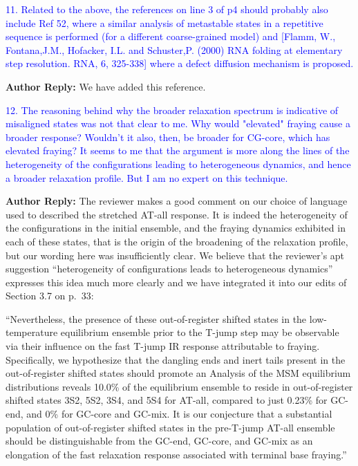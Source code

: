 \documentclass[11pt,a4paper]{letter} %
\newcommand*{\rood}[1]{{\color{red}{#1}}}
\begin{document}
\textcolor{blue}{11. Related to the above, the references on line 3 of p4 should probably also include Ref 52, where a similar analysis of metastable states in a repetitive sequence is performed (for a different coarse-grained model) and [Flamm, W., Fontana,J.M., Hofacker, I.L. and Schuster,P. (2000) RNA folding at elementary step resolution. RNA, 6, 325-338] where a defect diffusion mechanism is proposed.
}

\textbf{Author Reply:}   We have added this reference.


\textcolor{blue}{12. The reasoning behind why the broader relaxation spectrum is indicative of misaligned states was not that clear to me. Why would "elevated" fraying cause a broader response? Wouldn't it also, then, be broader for CG-core, which has elevated fraying? It seems to me that the argument is more along the lines of the heterogeneity of the configurations leading to heterogeneous dynamics, and hence a broader relaxation profile. But I am no expert on this technique.}

\textbf{Author Reply:}   The reviewer makes a good comment on our choice of language used to described the stretched AT-all response. It is indeed the heterogeneity of the configurations in the initial ensemble, and the fraying dynamics exhibited in each of these states, that is the origin of the broadening of the relaxation profile, but our wording here was insufficiently clear. We believe that the reviewer's apt suggestion ``heterogeneity of configurations leads to heterogeneous dynamics'' expresses this idea much more clearly and we have integrated it into our edits of Section 3.7 on p.~33:

``Nevertheless, the presence of these out-of-register shifted states in the low-temperature equilibrium ensemble prior to the T-jump step may be observable via their influence on the fast T-jump IR response attributable to fraying. Specifically, we hypothesize that the dangling ends and inert tails present in the out-of-register shifted states should promote an \rood{elevated fraying response over the course of the relaxation that is distinct from that of in-register fraying. This heterogeneity of configurations should lead to heterogeneous dynamics, manifested in the observation of a more stretched relaxation over experimental time scales of 70-100 ns.} Analysis of the MSM equilibrium distributions reveals 10.0\% of the equilibrium ensemble to reside in out-of-register shifted states 3S2, 5S2, 3S4, and 5S4 for AT-all, compared to just 0.23\% for GC-end, and 0\% for GC-core and GC-mix. It is our conjecture that a substantial population of out-of-register shifted states in the pre-T-jump AT-all ensemble should be distinguishable from the GC-end, GC-core, and GC-mix as an elongation of the fast relaxation response associated with terminal base fraying.''
\end{document}
